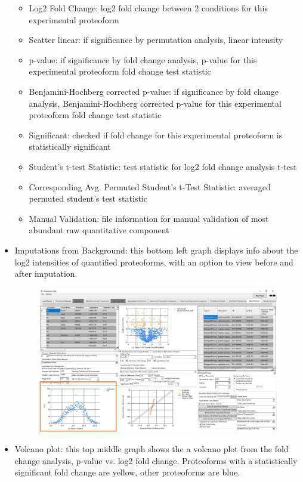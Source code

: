 \begin{itemize}
\begin{itemize}
	\item Log2 Fold Change: log2 fold change between 2 conditions for this experimental proteoform
	\item Scatter linear: if significance by permutation analysis, linear intensity
	\item p-value: if significance by fold change analysis, p-value for this experimental proteoform fold change test statistic
	\item Benjamini-Hochberg corrected p-value: if significance by fold change analysis, Benjamini-Hochberg corrected p-value for this experimental proteoform fold change test statistic
	\item Significant: checked if fold change for this experimental proteoform is statistically significant
	\item Student's t-test Statistic: test statistic for log2 fold change analysis t-test
	\item Corresponding Avg. Permuted Student's t-Test Statistic: averaged permuted student's test statistic
	\item Manual Validation: file information for manual validation of most abundant raw quantitative component 
\end{itemize}
\item Imputations from Background: this bottom left graph displays info about the log2 intensities of quantified proteoforms, with an option to view before and after imputation. 
\begin{figure}[h]
\centering
\includegraphics[scale=0.43]{figures/quant3.jpg}
\end{figure}
\pagebreak
\item Volcano plot: this top middle graph shows the a volcano plot from the fold change analysis, p-value vs. log2 fold change. Proteoforms with a statistically significant fold change are yellow, other proteoforms are blue.

\end{itemize}
